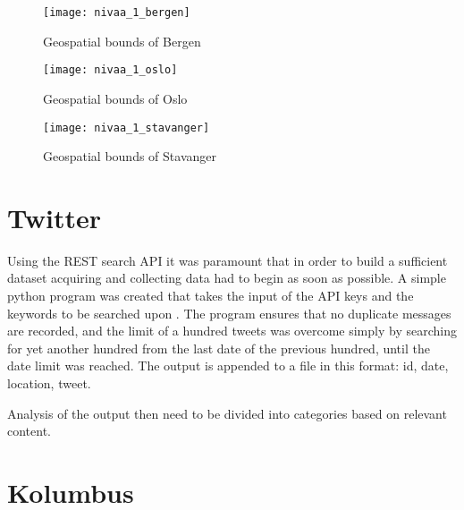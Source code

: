 \begin{figure}[ht]
\texttt{[image: nivaa\_1\_bergen]}
\centering
\caption{Geospatial bounds of Bergen}
\label{fig:boundsbergen}
\end{figure}

\begin{figure}[ht]
\texttt{[image: nivaa\_1\_oslo]}
\centering
\caption{Geospatial bounds of Oslo}
\label{fig:boundsoslo}
\end{figure}

\begin{figure}[ht]
\texttt{[image: nivaa\_1\_stavanger]}
\centering
\caption{Geospatial bounds of Stavanger}
\label{fig:boundsstavanger}
\end{figure}

\newpage\newpage

\section{Twitter}
Using the REST search API it was paramount that in order to build a sufficient dataset acquiring and collecting data had to begin as soon as possible. A simple python program was created that takes the input of the API keys and the keywords to be searched upon . The program ensures that no duplicate messages are recorded, and the limit of a hundred tweets was overcome simply by searching for yet another hundred from the last date of the previous hundred, until the date limit was reached.
The output is appended to a file in this format: id, date, location, tweet.

Analysis of the output then need to be divided into categories based on relevant content.

\section{Kolumbus}